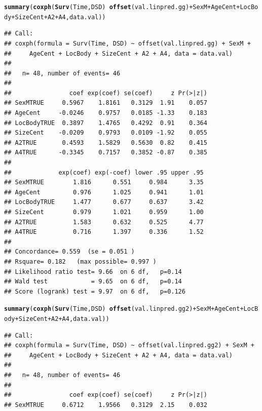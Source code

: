 \documentclass{article}\usepackage[]{graphicx}\usepackage[]{color}
\makeatletter
\newcommand{\hlopt}[1]{\textcolor[rgb]{0,0,0}{#1}}%
\newcommand{\hlstd}[1]{\textcolor[rgb]{0.345,0.345,0.345}{#1}}%
\newcommand{\hlkwd}[1]{\textcolor[rgb]{0.737,0.353,0.396}{\textbf{#1}}}%
\newenvironment{kframe}{%
 \def\at@end@of@kframe{}%
 \ifinner\ifhmode%
  \def\at@end@of@kframe{\end{minipage}}%
  \begin{minipage}{\columnwidth}%
 \fi\fi%
 \def\FrameCommand##1{\hskip\@totalleftmargin \hskip-\fboxsep
 \colorbox{shadecolor}{##1}\hskip-\fboxsep
     \hskip-\linewidth \hskip-\@totalleftmargin \hskip\columnwidth}%
 \MakeFramed {\advance\hsize-\width
   \@totalleftmargin\z@ \linewidth\hsize
   \@setminipage}}%
 {\par\unskip\endMakeFramed%
 \at@end@of@kframe}
\newenvironment{knitrout}{}{} %
\makeatother
\begin{document}
\begin{knitrout}
\begin{kframe}
{\ttfamily\noindent\bfseries\color{errorcolor}{\#\# Error in fitter(X, Y, strats, offset, init, control, weights = weights, : NA/NaN/Inf in foreign function call (arg 6)}}\begin{alltt}
\hlkwd{summary}\hlstd{(}\hlkwd{coxph}\hlstd{(}\hlkwd{Surv}\hlstd{(Time, DSD)} \hlopt{~} \hlkwd{offset}\hlstd{(val.linpred.gg)} \hlopt{+} \hlstd{SexM} \hlopt{+} \hlstd{AgeCent} \hlopt{+} \hlstd{LocBody} \hlopt{+} \hlstd{SizeCent} \hlopt{+} \hlstd{A2} \hlopt{+} \hlstd{A4, data.val))}
\end{alltt}
\begin{verbatim}
## Call:
## coxph(formula = Surv(Time, DSD) ~ offset(val.linpred.gg) + SexM + 
##     AgeCent + LocBody + SizeCent + A2 + A4, data = data.val)
## 
##   n= 48, number of events= 46 
## 
##                coef exp(coef) se(coef)     z Pr(>|z|)
## SexMTRUE     0.5967    1.8161   0.3129  1.91    0.057
## AgeCent     -0.0246    0.9757   0.0185 -1.33    0.183
## LocBodyTRUE  0.3897    1.4765   0.4292  0.91    0.364
## SizeCent    -0.0209    0.9793   0.0109 -1.92    0.055
## A2TRUE       0.4593    1.5829   0.5630  0.82    0.415
## A4TRUE      -0.3345    0.7157   0.3852 -0.87    0.385
## 
##             exp(coef) exp(-coef) lower .95 upper .95
## SexMTRUE        1.816      0.551     0.984      3.35
## AgeCent         0.976      1.025     0.941      1.01
## LocBodyTRUE     1.477      0.677     0.637      3.42
## SizeCent        0.979      1.021     0.959      1.00
## A2TRUE          1.583      0.632     0.525      4.77
## A4TRUE          0.716      1.397     0.336      1.52
## 
## Concordance= 0.559  (se = 0.051 )
## Rsquare= 0.182   (max possible= 0.997 )
## Likelihood ratio test= 9.66  on 6 df,   p=0.14
## Wald test            = 9.65  on 6 df,   p=0.14
## Score (logrank) test = 9.97  on 6 df,   p=0.126
\end{verbatim}
\begin{alltt}
\hlkwd{summary}\hlstd{(}\hlkwd{coxph}\hlstd{(}\hlkwd{Surv}\hlstd{(Time, DSD)} \hlopt{~} \hlkwd{offset}\hlstd{(val.linpred.gg2)} \hlopt{+} \hlstd{SexM} \hlopt{+} \hlstd{AgeCent} \hlopt{+} \hlstd{LocBody} \hlopt{+} \hlstd{SizeCent} \hlopt{+} \hlstd{A2} \hlopt{+} \hlstd{A4, data.val))}
\end{alltt}
\begin{verbatim}
## Call:
## coxph(formula = Surv(Time, DSD) ~ offset(val.linpred.gg2) + SexM + 
##     AgeCent + LocBody + SizeCent + A2 + A4, data = data.val)
## 
##   n= 48, number of events= 46 
## 
##                coef exp(coef) se(coef)     z Pr(>|z|)
## SexMTRUE     0.6712    1.9566   0.3129  2.15    0.032

\end{verbatim}
\end{kframe}
\end{knitrout}
\end{document}
